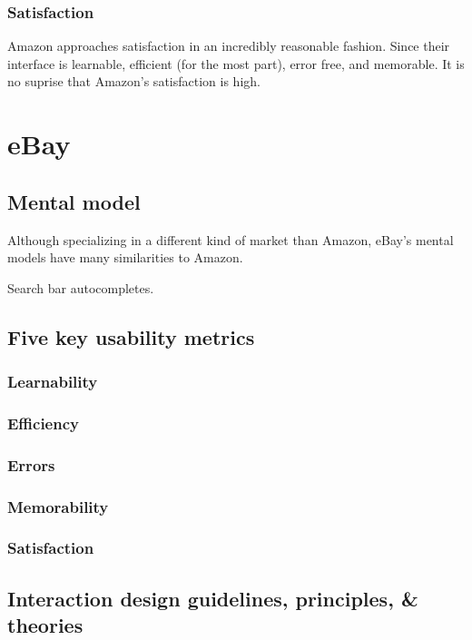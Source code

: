 \documentclass[11pt, oneside]{article}
\begin{document}
\subsubsection{Satisfaction}
Amazon approaches satisfaction in an incredibly reasonable fashion. Since their interface is learnable, efficient (for the most part), error free, and memorable. It is no suprise that Amazon's satisfaction is high.

\pagebreak

\section{eBay}

\subsection{Mental model}

Although specializing in a different kind of market than Amazon, eBay's mental models have many similarities to Amazon.

Search bar autocompletes.

\subsection{Five key usability metrics}
\subsubsection{Learnability}
\subsubsection{Efficiency}
\subsubsection{Errors}
\subsubsection{Memorability}
\subsubsection{Satisfaction}

\subsection{Interaction design guidelines, principles, \& theories}
\end{document}
